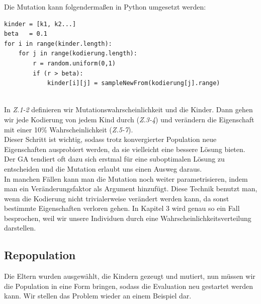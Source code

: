             Die Mutation kann folgendermaßen in Python umgesetzt werden:
            \begin{mdframed}
            \begin{verbatim}
kinder = [k1, k2...]
beta   = 0.1
for i in range(kinder.length):
    for j in range(kodierung.length):
        r = random.uniform(0,1)
        if (r > beta):
            kinder[i][j] = sampleNewFrom(kodierung[j].range)
            \end{verbatim}
            \end{mdframed}
            \hfill \\[1mm]
            \noindent
            In \textit{Z.1-2} definieren wir Mutationswahrscheinlichkeit und die Kinder. Dann gehen wir jede Kodierung von jedem Kind durch (\textit{Z.3-4}) und verändern die Eigenschaft mit einer 10\% Wahrscheinlichkeit (\textit{Z.5-7}).\\

            \noindent
            Dieser Schritt ist wichtig, sodass trotz konvergierter Population neue Eigenschaften ausprobiert werden, da sie vielleicht eine bessere Lösung bieten. Der GA tendiert oft dazu sich erstmal für eine suboptimalen Lösung zu entscheiden und die Mutation erlaubt uns einen Ausweg daraus. \\

            \noindent
            In manchen Fällen kann man die Mutation noch weiter parametrisieren, indem man ein Veränderungsfaktor als Argument hinzufügt. Diese Technik benutzt man, wenn die Kodierung nicht trivialerweise verändert werden kann, da sonst bestimmte Eigenschaften verloren gehen. In Kapitel 3 wird genau so ein Fall besprochen, weil wir unsere Individuen durch eine Wahrscheinlichkeitsverteilung darstellen. 

\newpage

        \subsection{Repopulation}
            Die Eltern wurden ausgewählt, die Kindern gezeugt und mutiert, nun müssen wir die Population in eine Form bringen, sodass die Evaluation neu gestartet werden kann. Wir stellen das Problem wieder an einem Beispiel dar.\\

